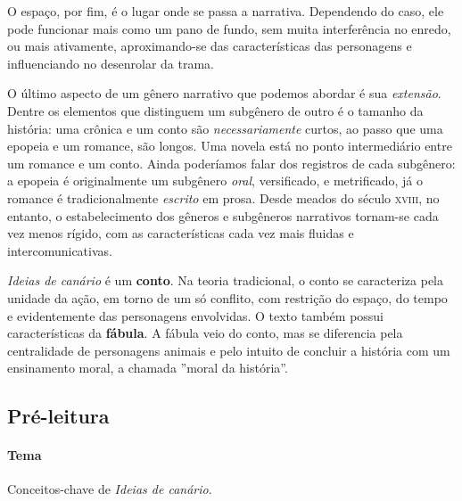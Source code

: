 \documentclass[11pt]{extarticle}
\begin{document}
O espaço, por fim, é o lugar onde se passa a narrativa. Dependendo do caso, ele pode funcionar mais como um pano de fundo, sem muita interferência no enredo, ou mais ativamente, aproximando-se das características das personagens e influenciando no desenrolar da trama. 


O último aspecto de um gênero narrativo que podemos abordar é sua \textit{extensão}. Dentre os elementos que distinguem um subgênero de outro é o tamanho da história: uma crônica e um conto são \textit{necessariamente} curtos, ao passo que uma epopeia e um romance, são longos. Uma novela está no ponto intermediário entre um romance e um conto. Ainda poderíamos falar dos registros de cada subgênero: a epopeia é originalmente um subgênero \textit{oral}, versificado, e metrificado, já o romance é tradicionalmente \textit{escrito} em prosa.  Desde meados do século \textsc{xviii}, no entanto, o estabelecimento dos gêneros e subgêneros narrativos tornam-se cada vez menos rígido, com as características cada vez mais fluidas e intercomunicativas.

\textit{Ideias de canário} é um \textbf{conto}. Na teoria tradicional, o conto se caracteriza pela unidade da ação, em torno de um só conflito, com restrição do espaço, do tempo e evidentemente das personagens envolvidas. O texto também possui características da \textbf{fábula}. A fábula veio do conto, mas se diferencia pela centralidade de personagens animais e pelo intuito de concluir a história com um ensinamento moral, a chamada ''moral da história''.

\subsection{Pré-leitura}


\paragraph{Tema} Conceitos-chave de \textit{Ideias de canário}.
\end{document}
